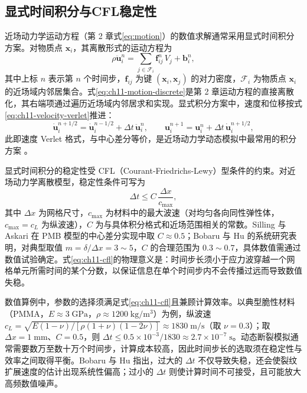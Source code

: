 \subsection{显式时间积分与CFL稳定性}\label{sec:ch11-explicit-time}

近场动力学运动方程（第 2 章式\eqref{eq:motion}）的数值求解通常采用显式时间积分方案。对物质点 $\mathbf{x}_i$，其离散形式的运动方程为
\begin{equation}
\rho\ddot{\mathbf{u}}_i^{n}=\sum_{j\in\mathcal{F}_i}\mathbf{f}_{ij}^{n}\,V_j+\mathbf{b}_i^{n},
\label{eq:ch11-motion-discrete}
\end{equation}
其中上标 $n$ 表示第 $n$ 个时间步，$\mathbf{f}_{ij}$ 为键 $(\mathbf{x}_i,\mathbf{x}_j)$ 的对力密度，$\mathcal{F}_i$ 为物质点 $\mathbf{x}_i$ 的近场域内邻居集合。式\eqref{eq:ch11-motion-discrete}是第 2 章运动方程的直接离散化，其右端项通过遍历近场域内邻居求和实现。显式积分方案中，速度和位移按式\eqref{eq:ch11-velocity-verlet}推进：
\begin{equation}
\dot{\mathbf{u}}_i^{n+1/2}=\dot{\mathbf{u}}_i^{n-1/2}+\Delta t\,\ddot{\mathbf{u}}_i^{n},\qquad
\mathbf{u}_i^{n+1}=\mathbf{u}_i^{n}+\Delta t\,\dot{\mathbf{u}}_i^{n+1/2},
\label{eq:ch11-velocity-verlet}
\end{equation}
此即速度 Verlet 格式，与中心差分等价，是近场动力学动态模拟中最常用的积分方案 \cite{SillingAskari2005}。

显式时间积分的稳定性受 CFL（Courant-Friedrichs-Lewy）型条件的约束。对近场动力学离散模型，稳定性条件可写为
\begin{equation}
\Delta t\leq C\,\frac{\Delta x}{c_{\max}},
\label{eq:ch11-cfl}
\end{equation}
其中 $\Delta x$ 为网格尺寸，$c_{\max}$ 为材料中的最大波速（对均匀各向同性弹性体，$c_{\max}=c_L$ 为纵波速），$C$ 为与具体积分格式和近场范围相关的常数。Silling 与 Askari \cite{SillingAskari2005} 在 PMB 模型的中心差分实现中取 $C\approx 0.5$；Bobaru 与 Hu \cite{BobaruHu2012} 的系统研究表明，对典型取值 $m=\delta/\Delta x=3\sim 5$，$C$ 的合理范围为 $0.3\sim 0.7$，具体数值需通过数值试验确定。式\eqref{eq:ch11-cfl}的物理意义是：时间步长须小于应力波穿越一个网格单元所需时间的某个分数，以保证信息在单个时间步内不会传播过远而导致数值失稳。

数值算例中，参数的选择须满足式\eqref{eq:ch11-cfl}且兼顾计算效率。以典型脆性材料（PMMA，$E\approx 3\;\mathrm{GPa}$，$\rho\approx 1200\;\mathrm{kg}/\mathrm{m}^3$）为例，纵波速 $c_L=\sqrt{E(1-\nu)/[\rho(1+\nu)(1-2\nu)]}\approx 1830\;\mathrm{m}/\mathrm{s}$（取 $\nu=0.3$）；取 $\Delta x=1\;\mathrm{mm}$、$C=0.5$，则 $\Delta t\leq 0.5\times 10^{-3}/1830\approx 2.7\times 10^{-7}\;\mathrm{s}$。动态断裂模拟通常需要数万至数十万个时间步，计算成本较高，因此时间步长的选取须在稳定性与效率之间取得平衡。Bobaru 与 Hu \cite{BobaruHu2012} 指出，过大的 $\Delta t$ 不仅导致失稳，还会使裂纹扩展速度的估计出现系统性偏高；过小的 $\Delta t$ 则使计算时间不可接受，且可能放大高频数值噪声。

